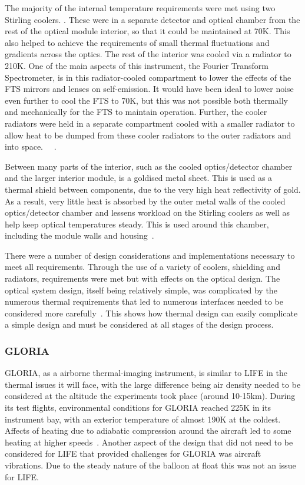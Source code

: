 The majority of the internal temperature requirements were met using two Stirling coolers. . These were in a separate detector and optical chamber from the rest of the optical module interior, so that it could be maintained at 70K. This also helped to achieve the requirements of small thermal fluctuations and gradients across the optics. The rest of the interior was cooled via a radiator to 210K. One of the main aspects of this instrument, the Fourier Transform Spectrometer, is in this radiator-cooled compartment to lower the effects of the FTS mirrors and lenses on self-emission. It would have been ideal to lower noise even further to cool the FTS to 70K, but this was not possible both thermally and mechanically for the FTS to maintain operation. Further, the cooler radiators were held in a separate compartment cooled with a smaller radiator to allow heat to be dumped from these cooler radiators to the outer radiators and into space. ~\citep{MIPAS_instrument}~\citep{MIPAS_thermal}.

Between many parts of the interior, such as the cooled optics/detector chamber and the larger interior module, is a goldised metal sheet. This is used as a thermal shield between components, due to the very high heat reflectivity of gold. As a result, very little heat is absorbed by the outer metal walls of the cooled optics/detector chamber and lessens workload on the Stirling coolers as well as help keep optical temperatures steady. This is used around this chamber, including the module walls and housing~\citep{MIPAS_thermal}.

There were a number of design considerations and implementations necessary to meet all requirements. Through the use of a variety of coolers, shielding and radiators, requirements were met but with effects on the optical design. The optical system design, itself being relatively simple, was complicated by the numerous thermal requirements that led to numerous interfaces needed to be considered more carefully~\citep{MIPAS_instrument}. This shows how thermal design can easily complicate a simple design and must be considered at all stages of the design process.

\subsubsection{GLORIA}
GLORIA, as a airborne thermal-imaging instrument, is similar to LIFE in the thermal issues it will face, with the large difference being air density needed to be considered at the altitude the experiments took place (around 10-15km). During its test flights, environmental conditions for GLORIA reached 225K in its instrument bay, with an exterior temperature of almost 190K at the coldest. Affects of heating due to adiabatic compression around the aircraft led to some heating at higher speeds~\citep{GLORIA_thermalmech}. Another aspect of the design that did not need to be considered for LIFE that provided challenges for GLORIA was aircraft vibrations. Due to the steady nature of the balloon at float this was not an issue for LIFE.

